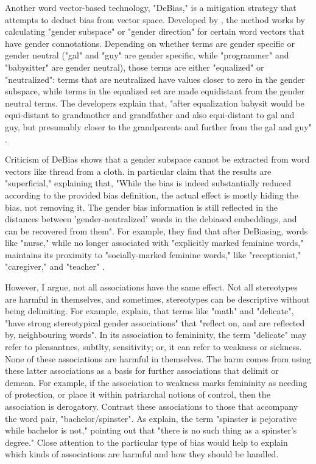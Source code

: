\documentclass[11pt]{article}
\begin{document}
Another word vector-based technology, "DeBias," is a mitigation
strategy that attempts to deduct bias from vector space. Developed
by \citet{bolukbasi:2016}, the method works by calculating "gender
subspace" or "gender direction" for certain word vectors that have
gender connotations. Depending on whether terms are gender specific or
gender neutral ("gal" and "guy" are gender specific, while
"programmer" and "babysitter" are gender neutral), those terms are
either "equalized" or "neutralized": terms that are neutralized have
values closer to zero in the gender subspace, while terms in the
equalized set are made equidistant from the gender neutral terms. The
developers explain that, "after equalization babysit would be
equi-distant to grandmother and grandfather and also equi-distant to
gal and guy, but presumably closer to the grandparents and further
from the gal and guy" \citep{bolukbasi:2016}.

Criticism of DeBias shows that a gender subspace cannot be extracted
from word vectors like thread from a cloth. \citet{gonen:2019} in
particular claim that the results are "superficial," explaining that,
"While the bias is indeed substantially reduced according to the
provided bias definition, the actual effect is mostly hiding the bias,
not removing it. The gender bias information is still reflected in the
distances between 'gender-neutralized' words in the debiased
embeddings, and can be recovered from them". For example, they find
that after DeBiasing, words like "nurse," while no longer associated
with "explicitly marked feminine words," maintains its proximity to
"socially-marked feminine words," like "receptionist," "caregiver,"
and "teacher" \citep{gonen:2019}.

However, I argue, not all associations have the same effect. Not all
stereotypes are harmful in themselves, and sometimes, stereotypes can
be descriptive without being delimiting. For
example, \citet{gonen:2019} explain, that terms like "math" and
"delicate", "have strong stereotypical gender associations" that
"reflect on, and are reflected by, neighbouring words". In its
association to femininity, the term "delicate" may refer to
pleasantnes, subtlty, sensitivity; or, it can refer to weakness or
sickness. None of these associations are harmful in themselves. The
harm comes from using these latter associations as a basis for further
associations that delimit or demean. For example, if the association
to weakness marks femininity as needing of protection, or place it
within patriarchal notions of control, then the association is
derogatory. Contrast these associations to those that accompany the
word pair, "bachelor/spinster". As \citet{devinney:2022} explain, the
term "spinster is pejorative while bachelor is not," pointing out that
"there is no such thing as a spinster’s degree." Close attention to
the particular type of bias would help to explain which kinds of
associations are harmful and how they should be handled.
\end{document}
